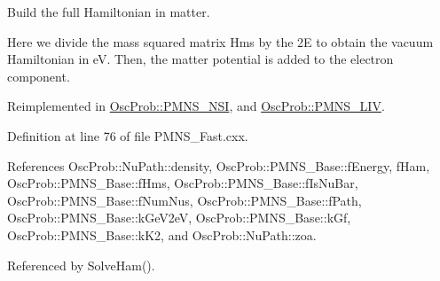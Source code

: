 Build the full Hamiltonian in matter.

Here we divide the mass squared matrix Hms by the 2E to obtain the vacuum Hamiltonian in eV. Then, the matter potential is added to the electron component. 

Reimplemented in \hyperlink{classOscProb_1_1PMNS__NSI_ab5c4f4644fbedb8835f6336c553805ce}{Osc\+Prob\+::\+P\+M\+N\+S\+\_\+\+N\+SI}, and \hyperlink{classOscProb_1_1PMNS__LIV_a848fc59ce966126dc6d6e6c32621ad6c}{Osc\+Prob\+::\+P\+M\+N\+S\+\_\+\+L\+IV}.



Definition at line 76 of file P\+M\+N\+S\+\_\+\+Fast.\+cxx.



References Osc\+Prob\+::\+Nu\+Path\+::density, Osc\+Prob\+::\+P\+M\+N\+S\+\_\+\+Base\+::f\+Energy, f\+Ham, Osc\+Prob\+::\+P\+M\+N\+S\+\_\+\+Base\+::f\+Hms, Osc\+Prob\+::\+P\+M\+N\+S\+\_\+\+Base\+::f\+Is\+Nu\+Bar, Osc\+Prob\+::\+P\+M\+N\+S\+\_\+\+Base\+::f\+Num\+Nus, Osc\+Prob\+::\+P\+M\+N\+S\+\_\+\+Base\+::f\+Path, Osc\+Prob\+::\+P\+M\+N\+S\+\_\+\+Base\+::k\+Ge\+V2eV, Osc\+Prob\+::\+P\+M\+N\+S\+\_\+\+Base\+::k\+Gf, Osc\+Prob\+::\+P\+M\+N\+S\+\_\+\+Base\+::k\+K2, and Osc\+Prob\+::\+Nu\+Path\+::zoa.



Referenced by Solve\+Ham().


